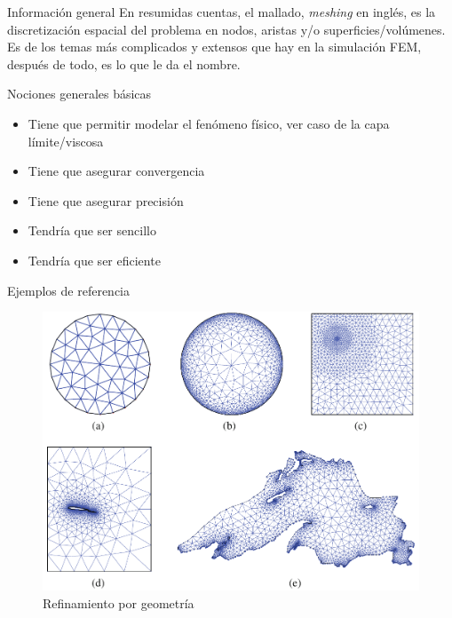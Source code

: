 \documentclass[12pt]{beamer}
\begin{document}
\begin{frame}{Información general}
	En resumidas cuentas, el mallado, \textit{meshing} en inglés, es la discretización espacial del problema en nodos, aristas y/o superficies/volúmenes. 
	Es de los temas más complicados y extensos que hay en la simulación FEM, después de todo, es lo que le da el nombre.
	
	\begin{block}{Nociones generales básicas}
		\begin{itemize}
			\item Tiene que permitir modelar el fenómeno físico, ver caso de la capa límite/viscosa
			\item Tiene que asegurar convergencia
			\item Tiene que asegurar precisión
			\item Tendría que ser sencillo
			\item Tendría que ser eficiente
		\end{itemize}
	\end{block}
\end{frame}

\begin{frame}{Ejemplos de referencia}
	\begin{figure}
		\centering
		\includegraphics[width=0.9\linewidth]{mesh_refinement}
		\caption{Refinamiento por geometría}
		\label{fig:meshrefinement}
	\end{figure}
\end{frame}
\end{document}
